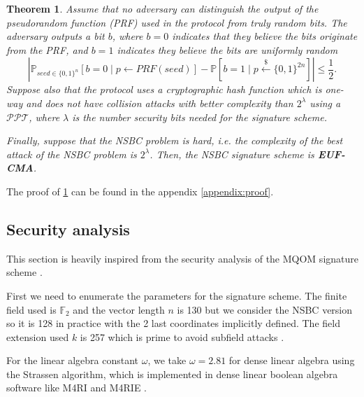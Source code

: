 \documentclass[english]{article}
\newtheorem{theorem}{Theorem}[section]
\begin{document}
		\begin{theorem}\label{EUF-CMA}
			Assume that no adversary can distinguish the output of the pseudorandom function (PRF) used in the protocol from truly random bits. The adversary outputs a bit $b$, where $b=0$ indicates that they believe the bits originate from the PRF, and $b=1$ indicates they believe the bits are uniformly random
			$$
				| \mathbb{P}_{seed \in \{0,1\}^n}[b=0 \mid p \leftarrow PRF(seed)] - \mathbb{P}[b=1 \mid p \overset{{\scriptscriptstyle\$}}{\leftarrow} \{0,1\}^{2n}] | \leq \frac{1}{2}.
			$$
			Suppose also that the protocol uses a cryptographic hash function which is one-way and does not have collision attacks with better complexity than $2^{\lambda}$ using a $\mathcal{PPT}$, where $\lambda$ is the number security bits needed for the signature scheme.
			
			Finally, suppose that the NSBC problem is hard, i.e. the complexity of the best attack of the NSBC problem is $2^{\lambda}$.
			Then, the NSBC signature scheme is \textbf{EUF-CMA}.
		\end{theorem}
		The proof of \ref{EUF-CMA} can be found in the appendix \ref{appendix:proof}.
		
		\subsection{Security analysis}
		This section is heavily inspired from the security analysis of the MQOM signature scheme \cite{MQOMv2}.

		First we need to enumerate the parameters for the signature scheme. The finite field used is $\mathbb{F}_2$ and the vector length $n$ is 130 but we consider the NSBC version so it is 128 in practice with the 2 last coordinates implicitly defined. The field extension used $k$ is 257 which is prime to avoid subfield attacks \cite{Peb24}.
		
		For the linear algebra constant $\omega$, we take $\omega = 2.81$ for dense linear algebra using the Strassen algorithm, which is implemented in dense linear boolean algebra software like M4RI and M4RIE \cite{M4RI}.
		
\end{document}
